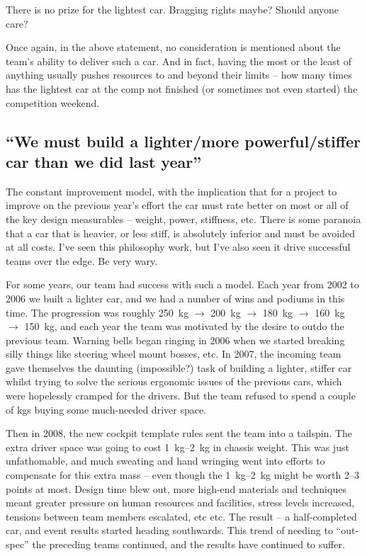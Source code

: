 \documentclass[10pt, a4paper, article, oneside, twocolumn, final]{memoir}
\begin{document}
There is no prize for the lightest car. Bragging rights maybe? Should anyone care? 

Once again, in the above statement, no consideration is mentioned about the team's ability to deliver such a car. And in fact, having the most or the least of anything usually pushes resources to and beyond their limits -- how many times has the lightest car at the comp not finished (or sometimes not even started) the competition weekend. 

\subsection*{“We must build a lighter/\allowbreak more powerful/\allowbreak stiffer car than we did last year”}
The constant improvement model, with the implication that for a project to improve on the previous year's effort the car must rate better on most or all of the key design measurables -- weight, power, stiffness, etc. There is some paranoia that a car that is heavier, or less stiff, is absolutely inferior and must be avoided at all costs. I've seen this philosophy work, but I've also seen it drive successful teams over the edge. Be very wary. 

For some years, our team had success with such a model. Each year from 2002 to 2006 we built a lighter car, and we had a number of wins and podiums in this time. The progression was roughly \SI{250}{\kilogram} $\rightarrow$ \SI{200}{\kilogram} $\rightarrow$ \SI{180}{\kilogram} $\rightarrow$ \SI{160}{\kilogram} $\rightarrow$ \SI{150}{\kilogram}, and each year the team was motivated by the desire to outdo the previous team. Warning bells began ringing in 2006 when we started breaking silly things like steering wheel mount bosses, etc. In 2007, the incoming team gave themselves the daunting (impossible?) task of building a lighter, stiffer car whilst trying to solve the serious ergonomic issues of the previous cars, which were hopelessly cramped for the drivers. But the team refused to spend a couple of kgs buying some much-needed driver space. 

Then in 2008, the new cockpit template rules sent the team into a tailspin. The extra driver space was going to cost \SIrange{1}{2}{\kilogram} in chassis weight. This was just unfathomable, and much sweating and hand wringing went into efforts to compensate for this extra mass -- even though the \SIrange{1}{2}{\kilogram} might be worth \numrange{2}{3} points at most. Design time blew out, more high-end materials and techniques meant greater pressure on human resources and facilities, stress levels increased, tensions between team members escalated, etc etc. The result -- a half-completed car, and event results started heading southwards. This trend of needing to “out-spec” the preceding teams continued, and the results have continued to suffer. 
\end{document}
